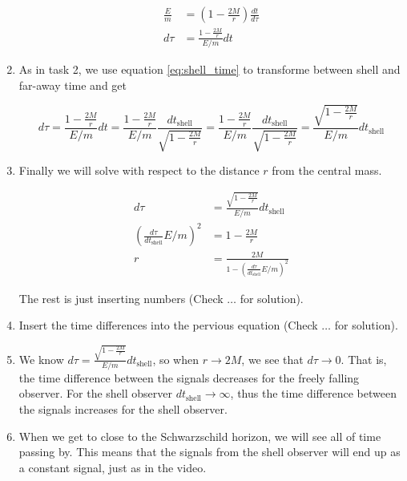 \documentclass[a4paper,10pt,english]{article}
\begin{document}
\begin{enumerate}
\begin{align*}
\frac{E}{m}&=\left(1-\frac{2M}{r}\right)\frac{dt}{d\tau}\\
d\tau&=\frac{1-\frac{2M}{r}}{E/m}dt
\end{align*}

\item As in task 2, we use equation \ref{eq:shell_time} to transforme between shell and far-away time and get

\begin{equation*}
d\tau=\frac{1-\frac{2M}{r}}{E/m}dt=\frac{1-\frac{2M}{r}}{E/m}\frac{dt_{\text{shell}}}{\sqrt{1-\frac{2M}{r}}}=\frac{1-\frac{2M}{r}}{E/m}\frac{dt_{\text{shell}}}{\sqrt{1-\frac{2M}{r}}}=\frac{\sqrt{1-\frac{2M}{r}}}{E/m}dt_{\text{shell}}
\end{equation*}

\item Finally we will solve with respect to the distance $r$ from the central mass.

\begin{align*}
d\tau&=\frac{\sqrt{1-\frac{2M}{r}}}{E/m}dt_{\text{shell}}\\
\left(\frac{d\tau}{dt_{\text{shell}}}E/m\right)^{2}&=1-\frac{2M}{r}\\
r&=\frac{2M}{1-\left(\frac{d\tau}{dt_{\text{shell}}}E/m\right)^{2}}
\end{align*}

The rest is just inserting numbers (Check $\ldots$ for solution).

\item Insert the time differences into the pervious equation (Check $\ldots$ for solution).

\item We know $d\tau=\frac{\sqrt{1-\frac{2M}{r}}}{E/m}dt_{\text{shell}}$, so when $r\to2M$, we see that $d\tau\to0$. That is, the time difference between the signals decreases for the freely falling observer. For the shell observer $dt_{\text{shell}}\to\infty$, thus the time difference between the signals increases for the shell observer.

\item When we get to close to the Schwarzschild horizon, we will see all of time passing by. This means that the signals from the shell observer will end up as a constant signal, just as in the video.

\end{enumerate}
\end{document}
